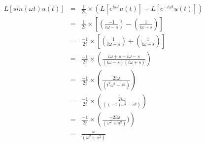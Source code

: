 \documentclass{article}
\begin{document}
\begin{eqnarray}
L[sin(\omega t) u(t)] & = &\frac{1}{2i}\times(L[e^{i\omega t} u(t)] - L[e^{-i\omega t} u(t)]) \\
&=& \frac{1}{2i}\times \left[\left(\frac{-1}{i\omega-s}\right) - \left(\frac{1}{i\omega+s}\right)\right]\\
&=& \frac{-1}{2i}\times \left[\left(\frac{1}{i\omega-s}\right) + \left(\frac{1}{i\omega+s}\right)\right] \\
&=& \frac{-1}{2i}\times \left(\frac{i\omega+s + i\omega-s}{(i\omega-s)(i\omega+s)}\right) \\
&=& \frac{-1}{2i}\times \left(\frac{2i\omega}{(i^2\omega ^2 -s^2)}\right) \\
&=& \frac{-1}{2i}\times \left(\frac{2i\omega}{((-1)\omega ^2 -s^2)}\right) \\
&=& \frac{-1}{2i}\times \left(\frac{-2i\omega}{(\omega ^2 + s^2)})\right) \\
&=& \frac{\omega}{(\omega ^2 + s^2)}
\end{eqnarray}
\end{document}
